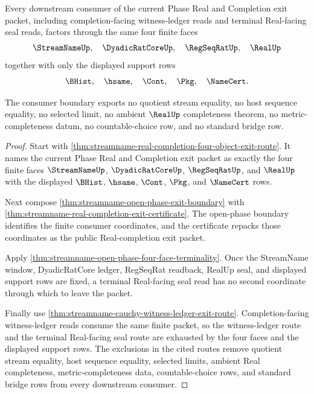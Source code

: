 \begin{theorem}
\label{thm:streamname-real-completion-four-object-exit-consumer-exhaustion}
Every downstream consumer of the current Phase Real and Completion exit packet, including completion-facing witness-ledger reads and terminal Real-facing seal reads, factors through the same four finite faces
$$
\StreamNameUp,\quad \DyadicRatCoreUp,\quad \RegSeqRatUp,\quad \RealUp
$$
together with only the displayed support rows
$$
\BHist,\quad \hsame,\quad \Cont,\quad \Pkg,\quad \NameCert.
$$

The consumer boundary exports no quotient stream equality, no host sequence equality, no selected limit, no ambient $\RealUp$ completeness theorem, no metric-completeness datum, no countable-choice row, and no standard bridge row.
\end{theorem}
\begin{proof}
Start with \autoref{thm:streamname-real-completion-four-object-exit-route}. It names the current Phase Real and Completion exit packet as exactly the four finite faces $\StreamNameUp$, $\DyadicRatCoreUp$, $\RegSeqRatUp$, and $\RealUp$ with the displayed $\BHist$, $\hsame$, $\Cont$, $\Pkg$, and $\NameCert$ rows.

Next compose \autoref{thm:streamname-open-phase-exit-boundary} with \autoref{thm:streamname-real-completion-exit-certificate}. The open-phase boundary identifies the finite consumer coordinates, and the certificate repacks those coordinates as the public Real-completion exit packet.

Apply \autoref{thm:streamname-open-phase-four-face-terminality}. Once the StreamName window, DyadicRatCore ledger, RegSeqRat readback, RealUp seal, and displayed support rows are fixed, a terminal Real-facing seal read has no second coordinate through which to leave the packet.

Finally use \autoref{thm:streamname-cauchy-witness-ledger-exit-route}. Completion-facing witness-ledger reads consume the same finite packet, so the witness-ledger route and the terminal Real-facing seal route are exhausted by the four faces and the displayed support rows. The exclusions in the cited routes remove quotient stream equality, host sequence equality, selected limits, ambient Real completeness, metric-completeness data, countable-choice rows, and standard bridge rows from every downstream consumer.
\end{proof}

